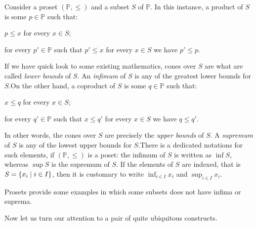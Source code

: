 \begin{example}
  Consider a proset \((\mathbb P, \le)\) and a subset \(S\) of
  \(\mathbb P\). In this instance, a product of \(S\) is some
  \(p \in \mathbb P\) such that:
  \begin{tcbenum}
  \item \(p \le x\) for every \(x \in S\);
  \item for every \(p' \in \mathbb P\) such that \(p' \le x\) for every
    \(x \in S\) we have \(p' \le p\).
  \end{tcbenum}
  If we have quick look to some existing mathematics, cones over \(S\)
  are what are called {\em lower bounds} of \(S\). An {\em infimum} of
  \(S\) is any of the greatest lower bounds for \(S\).\newline On the other
  hand, a coproduct of \(S\) is some \(q \in \mathbb P\) such that:
  \begin{tcbenum}
  \item \(x \le q\) for every \(x \in S\);
  \item for every \(q' \in \mathbb P\) such that \(x \le q'\) for every
    \(x \in S\) we have \(q \le q'\).
  \end{tcbenum}
  In other words, the cones over \(S\) are precisely the {\em upper
    bounds} of \(S\). A {\em supremum} of \(S\) is any of the lowest
  upper bounds for \(S\).\newline There is a dedicated notations for such
  elements, if \((\mathbb P, \le)\) is a poset: the infimum of \(S\) is
  written as \(\inf S\), whereas \(\sup S\) is the supremum of \(S\). If
  the elements of \(S\) are indexed, that is
  \(S = \left\{x_i \mid i \in I\right\}\), then it is customary to write
  \(\inf_{i \in I} x_i\) and \(\sup_{i \in I} x_i\).
\end{example}

\begin{exercise}
  Prosets provide some examples in which some subsets does not have
  infima or suprema.
\end{exercise}

Now let us turn our attention to a pair of quite ubiquitous constructs.

